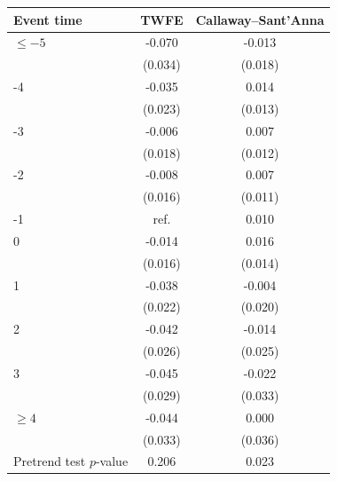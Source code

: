 \begin{tabular}{lcc}
\toprule
Event time & TWFE & Callaway--Sant'Anna \\
\midrule
\(\le -5\) & -0.070 & -0.013 \\
 & (0.034) & (0.018) \\
-4 & -0.035 &  0.014 \\
 & (0.023) & (0.013) \\
-3 & -0.006 &  0.007 \\
 & (0.018) & (0.012) \\
-2 & -0.008 &  0.007 \\
 & (0.016) & (0.011) \\
-1 & \multicolumn{1}{c}{ref.} &  0.010 \\
0 & -0.014 &  0.016 \\
 & (0.016) & (0.014) \\
1 & -0.038 & -0.004 \\
 & (0.022) & (0.020) \\
2 & -0.042 & -0.014 \\
 & (0.026) & (0.025) \\
3 & -0.045 & -0.022 \\
 & (0.029) & (0.033) \\
\(\ge 4\) & -0.044 &  0.000 \\
 & (0.033) & (0.036) \\
\midrule
Pretrend test \(p\)-value & 0.206 & 0.023 \\
\bottomrule
\end{tabular}
